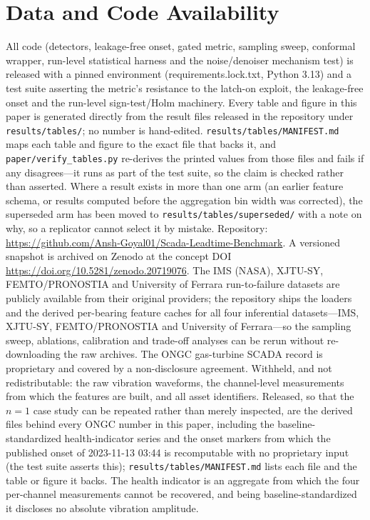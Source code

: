 \documentclass[IJPHM, 2026, 0]{PHMSociety}
\makeatletter
\def\PHMslashbreak{\kern\z@\discretionary{}{}{}}
\makeatother
\begin{document}
\section*{Data and Code Availability}
All code (detectors, leakage-free onset, gated metric, sampling sweep, conformal wrapper, run-level statistical harness and the noise/denoiser mechanism test) is released with a pinned environment (requirements.lock.txt, Python 3.13) and a test suite asserting the metric's resistance to the latch-on exploit, the leakage-free onset and the run-level sign-test/Holm machinery. Every table and figure in this paper is generated directly from the result files released in the repository under \texttt{results/tables/}; no number is hand-edited. \texttt{results/tables/MANIFEST.md} maps each table and figure to the exact file that backs it, and \texttt{paper/verify\_tables.py} re-derives the printed values from those files and fails if any disagrees---it runs as part of the test suite, so the claim is checked rather than asserted. Where a result exists in more than one arm (an earlier feature schema, or results computed before the aggregation bin width was corrected), the superseded arm has been moved to \texttt{results/tables/superseded/} with a note on why, so a replicator cannot select it by mistake. Repository: \url{https://github.com/Ansh-Goyal01/Scada-Leadtime-Benchmark}. A versioned snapshot is archived on Zenodo at the concept DOI \url{https://doi.org/10.5281/zenodo.20719076}. The IMS (NASA), XJTU-SY, FEMTO/\PHMslashbreak PRONOSTIA and University of Ferrara run-to-failure datasets are publicly available from their original providers; the repository ships the loaders and the derived per-bearing feature caches for all four inferential datasets---IMS, XJTU-SY, FEMTO/\PHMslashbreak PRONOSTIA and University of Ferrara---so the sampling sweep, ablations, calibration and trade-off analyses can be rerun without re-downloading the raw archives. The ONGC gas-turbine SCADA record is proprietary and covered by a non-disclosure agreement. Withheld, and not redistributable: the raw vibration waveforms, the channel-level measurements from which the features are built, and all asset identifiers. Released, so that the $n=1$ case study can be repeated rather than merely inspected, are the derived files behind every ONGC number in this paper, including the baseline-standardized health-indicator series and the onset markers from which the published onset of 2023-11-13 03:44 is recomputable with no proprietary input (the test suite asserts this); \texttt{results/tables/MANIFEST.md} lists each file and the table or figure it backs. The health indicator is an aggregate from which the four per-channel measurements cannot be recovered, and being baseline-standardized it discloses no absolute vibration amplitude.
\end{document}
